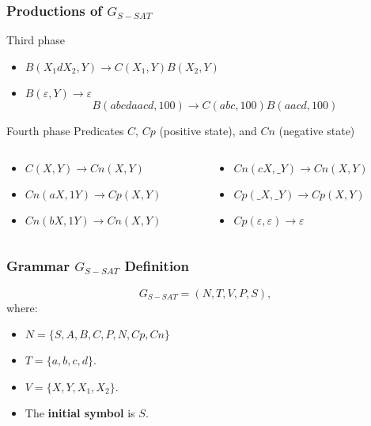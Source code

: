 \documentclass{beamer}
\begin{document}
\begin{frame}
    \frametitle{Productions of $G_{S-SAT}$}

    \begin{block}{Third phase}
        \begin{itemize}
            \item $B(X_1dX_2,Y)\to C(X_1,Y) B(X_2,Y)$
                  \pause
            \item $B(\varepsilon,Y)\to\varepsilon$
                  \pause
                  $$B(abcdaacd,100)\to C(abc,100) B(aacd,100)$$
        \end{itemize}
    \end{block}
    \pause
    \begin{block}{Fourth phase}
        Predicates $C$, $Cp$ (positive state), and $Cn$ (negative state)\\
        \begin{columns}
            \begin{column}{0.45\textwidth}
                \begin{itemize}
                    \item $C(X,Y)\to Cn(X,Y)$
                          \pause
                    \item $Cn(aX,1Y)\to Cp(X,Y)$
                          \pause
                    \item $Cn(bX,1Y)\to Cn(X,Y)$
                \end{itemize}
            \end{column}
            \pause
            \begin{column}{0.45\textwidth}
                \begin{itemize}
                    \item $Cn(cX,\_Y)\to Cn(X,Y)$
                          \pause
                    \item $Cp(\_X,\_Y)\to Cp(X,Y)$
                          \pause
                    \item $Cp(\varepsilon,\varepsilon)\to \varepsilon$
                \end{itemize}
            \end{column}
        \end{columns}
    \end{block}
\end{frame}

\begin{frame}
    \frametitle{Grammar $G_{S-SAT}$ Definition}

    \[
        G_{S-SAT} = (N, T, V, P, S),
    \]
    where:

    \begin{itemize}
        \item $N=\{S,A,B,C,P,N,Cp,Cn\}$
        \item $T=\{a,b,c,d\}$.
        \item $V=\{X,Y,X_1,X_2\}$.
        \item The \textbf{initial symbol} is $S$.
    \end{itemize}
\end{frame}
\end{document}
